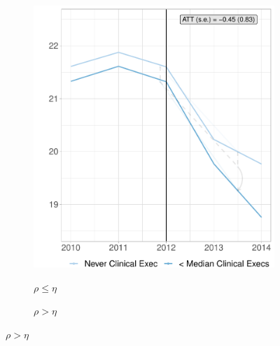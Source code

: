 \documentclass[12pt]{article}
\begin{document}
        \begin{figure}[ht!]
     \caption{Effect of Clinical Training on Readmission Rates, Binned Treatment}
     \centering
     \begin{subfigure}[b]{0.45\textwidth}
         \centering
         \caption{$\rho \leq \eta$}
         \includegraphics[width=\textwidth]{Objects/cont_belowmedread_md_nomd_size_synth_graph.pdf}
         \label{fig:belowmed_read_synth_clinical}
     \end{subfigure}
     \hfill
     \begin{subfigure}[b]{0.45\textwidth}
         \centering
         \caption{$\rho > \eta$}

\end{subfigure}
\end{figure}
\end{document}
